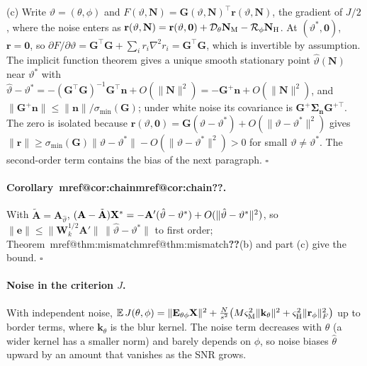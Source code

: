 \documentclass[10pt,twocolumn,letterpaper]{article}
\makeatletter
\newcommand{\mref}[1]{\ifcsname mref@#1\endcsname\csname mref@#1\endcsname\else\textbf{??}\fi}
\makeatother
\begin{document}
(c) Write $\vartheta=(\theta,\phi)$ and $F(\vartheta,\mathbf{N})=\mathbf{G}(\vartheta,\mathbf{N})^{\top}\mathbf{r}(\vartheta,\mathbf{N})$, the gradient of $J/2$, where the noise enters as $\mathbf{r}(\vartheta,\mathbf{N})=\mathbf{r}(\vartheta,\mathbf{0})+\mathcal{D}_\theta\mathbf{N}_{\mathrm{M}}-\mathcal{R}_\phi\mathbf{N}_{\mathrm{H}}$. At $(\vartheta^*,\mathbf{0})$, $\mathbf{r}=\mathbf{0}$, so $\partial F/\partial\vartheta=\mathbf{G}^{\top}\mathbf{G}+\sum_i r_i\nabla^2r_i=\mathbf{G}^{\top}\mathbf{G}$, which is invertible by assumption. The implicit function theorem gives a unique smooth stationary point $\hat\vartheta(\mathbf{N})$ near $\vartheta^*$ with $\hat\vartheta-\vartheta^*=-(\mathbf{G}^{\top}\mathbf{G})^{-1}\mathbf{G}^{\top}\mathbf{n}+O(\|\mathbf{N}\|^2)=-\mathbf{G}^{+}\mathbf{n}+O(\|\mathbf{N}\|^2)$, and $\|\mathbf{G}^{+}\mathbf{n}\|\le\|\mathbf{n}\|/\sigma_{\min}(\mathbf{G})$; under white noise its covariance is $\mathbf{G}^{+}\boldsymbol{\Sigma}_{\mathbf{n}}\mathbf{G}^{+\top}$. The zero is isolated because $\mathbf{r}(\vartheta,\mathbf{0})=\mathbf{G}(\vartheta-\vartheta^*)+O(\|\vartheta-\vartheta^*\|^2)$ gives $\|\mathbf{r}\|\ge\sigma_{\min}(\mathbf{G})\|\vartheta-\vartheta^*\|-O(\|\vartheta-\vartheta^*\|^2)>0$ for small $\vartheta\neq\vartheta^*$. The second-order term contains the bias of the next paragraph. \hfill$\square$

\paragraph{Corollary~\mref{cor:chain}.} With $\tilde{\mathbf{A}}=\mathbf{A}_{\hat\vartheta}$, $(\mathbf{A}-\tilde{\mathbf{A}})\mathbf{X}^*=-\mathbf{A}'(\hat\vartheta-\vartheta^*)+O(\|\hat\vartheta-\vartheta^*\|^2)$, so $\|\mathbf{e}\|\le\|\mathbf{W}_k^{1/2}\mathbf{A}'\|\,\|\hat\vartheta-\vartheta^*\|$ to first order; Theorem~\mref{thm:mismatch}(b) and part (c) give the bound. \hfill$\square$

\paragraph{Noise in the criterion $J$.} With independent noise, $\mathbb{E}\,J(\theta,\phi)=\|\mathbf{E}_{\theta\phi}\mathbf{X}\|^2+\tfrac{N}{s^2}\big(M\varsigma_{\mathrm{M}}^2\|\mathbf{k}_\theta\|^2+\varsigma_{\mathrm{H}}^2\|\mathbf{r}_\phi\|_F^2\big)$ up to border terms, where $\mathbf{k}_\theta$ is the blur kernel. The noise term decreases with $\theta$ (a wider kernel has a smaller norm) and barely depends on $\phi$, so noise biases $\hat\theta$ upward by an amount that vanishes as the SNR grows.
\end{document}
